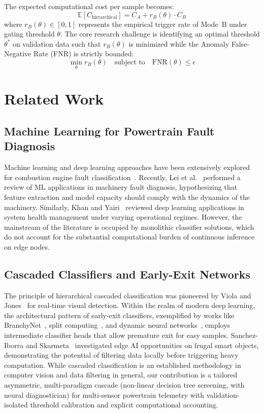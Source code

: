 \documentclass[journal]{IEEEtran}
\begin{document}
The expected computational cost per sample becomes:
\begin{equation}
    \mathbb{E}[C_{\text{hierarchical}}] = C_A + r_B(\theta) \cdot C_B
    \label{eq:cost_model}
\end{equation}
where $r_B(\theta) \in [0, 1]$ represents the empirical trigger rate of Mode~B under gating threshold $\theta$. The core research challenge is identifying an optimal threshold $\theta^*$ on validation data such that $r_B(\theta)$ is minimized while the Anomaly False-Negative Rate (FNR) is strictly bounded:
\begin{equation}
    \min_{\theta} r_B(\theta) \quad \text{subject to} \quad \text{FNR}(\theta) \le \epsilon
\end{equation}

\section{Related Work}
\subsection{Machine Learning for Powertrain Fault Diagnosis}
Machine learning and deep learning approaches have been extensively explored for combustion engine fault classification~\cite{aliramezani2022modeling,ahmed2015automotive,liu2018artificial}. Recently, Lei et al.~\cite{lei2020applications} performed a review of ML applications in machinery fault diagnosis, hypothesizing that feature extraction and model capacity should comply with the dynamics of the machinery. Similarly, Khan and Yairi~\cite{khan2018review} reviewed deep learning applications in system health management under varying operational regimes. However, the mainstream of the literature is occupied by monolithic classifier solutions, which do not account for the substantial computational burden of continuous inference on edge nodes.

\subsection{Cascaded Classifiers and Early-Exit Networks}
The principle of hierarchical cascaded classification was pioneered by Viola and Jones~\cite{viola2004robust} for real-time visual detection. Within the realm of modern deep learning, the architectural pattern of early-exit classifiers, exemplified by works like BranchyNet~\cite{teerapittayanon2016branchynet}, split computing~\cite{matsubara2022split}, and dynamic neural networks~\cite{han2021dynamic}, employs intermediate classifier heads that allow premature exit for easy samples. Sanchez-Iborra and Skarmeta~\cite{sanchez2020tinyml} investigated edge AI opportunities on frugal smart objects, demonstrating the potential of filtering data locally before triggering heavy computation. While cascaded classification is an established methodology in computer vision and data filtering in general, our contribution is a tailored asymmetric, multi-paradigm cascade (non-linear decision tree screening, with neural diagnostician) for multi-sensor powertrain telemetry with validation-isolated threshold calibration and explicit computational accounting.
\end{document}
